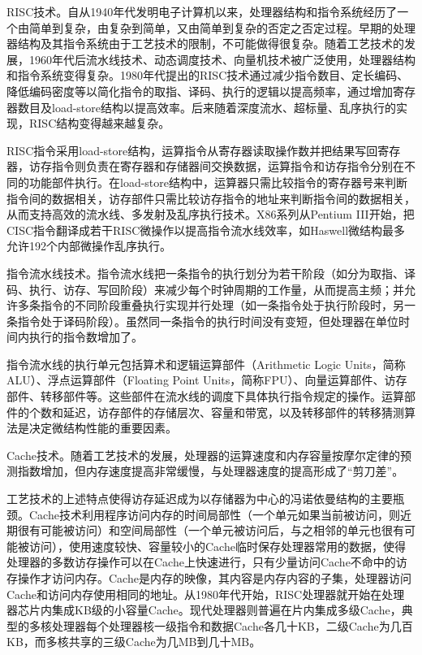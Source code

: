 \documentclass[]{ctexbook}
\begin{document}
RISC技术。自从1940年代发明电子计算机以来，处理器结构和指令系统经历了一个由简单到复杂，由复杂到简单，又由简单到复杂的否定之否定过程。早期的处理器结构及其指令系统由于工艺技术的限制，不可能做得很复杂。随着工艺技术的发展，1960年代后流水线技术、动态调度技术、向量机技术被广泛使用，处理器结构和指令系统变得复杂。1980年代提出的RISC技术通过减少指令数目、定长编码、降低编码密度等以简化指令的取指、译码、执行的逻辑以提高频率，通过增加寄存器数目及load-store结构以提高效率。后来随着深度流水、超标量、乱序执行的实现，RISC结构变得越来越复杂。

RISC指令采用load-store结构，运算指令从寄存器读取操作数并把结果写回寄存器，访存指令则负责在寄存器和存储器间交换数据，运算指令和访存指令分别在不同的功能部件执行。在load-store结构中，运算器只需比较指令的寄存器号来判断指令间的数据相关，访存部件只需比较访存指令的地址来判断指令间的数据相关，从而支持高效的流水线、多发射及乱序执行技术。X86系列从Pentium III开始，把CISC指令翻译成若干RISC微操作以提高指令流水线效率，如Haswell微结构最多允许192个内部微操作乱序执行。

指令流水线技术。指令流水线把一条指令的执行划分为若干阶段（如分为取指、译码、执行、访存、写回阶段）来减少每个时钟周期的工作量，从而提高主频；并允许多条指令的不同阶段重叠执行实现并行处理（如一条指令处于执行阶段时，另一条指令处于译码阶段）。虽然同一条指令的执行时间没有变短，但处理器在单位时间内执行的指令数增加了。

指令流水线的执行单元包括算术和逻辑运算部件（Arithmetic Logic Units，简称ALU）、浮点运算部件（Floating Point Units，简称FPU）、向量运算部件、访存部件、转移部件等。这些部件在流水线的调度下具体执行指令规定的操作。运算部件的个数和延迟，访存部件的存储层次、容量和带宽，以及转移部件的转移猜测算法是决定微结构性能的重要因素。

Cache技术。随着工艺技术的发展，处理器的运算速度和内存容量按摩尔定律的预测指数增加，但内存速度提高非常缓慢，与处理器速度的提高形成了``剪刀差''。

工艺技术的上述特点使得访存延迟成为以存储器为中心的冯诺依曼结构的主要瓶颈。Cache技术利用程序访问内存的时间局部性（一个单元如果当前被访问，则近期很有可能被访问）和空间局部性（一个单元被访问后，与之相邻的单元也很有可能被访问），使用速度较快、容量较小的Cache临时保存处理器常用的数据，使得处理器的多数访存操作可以在Cache上快速进行，只有少量访问Cache不命中的访存操作才访问内存。Cache是内存的映像，其内容是内存内容的子集，处理器访问Cache和访问内存使用相同的地址。从1980年代开始，RISC处理器就开始在处理器芯片内集成KB级的小容量Cache。现代处理器则普遍在片内集成多级Cache，典型的多核处理器每个处理器核一级指令和数据Cache各几十KB，二级Cache为几百KB，而多核共享的三级Cache为几MB到几十MB。
\end{document}
